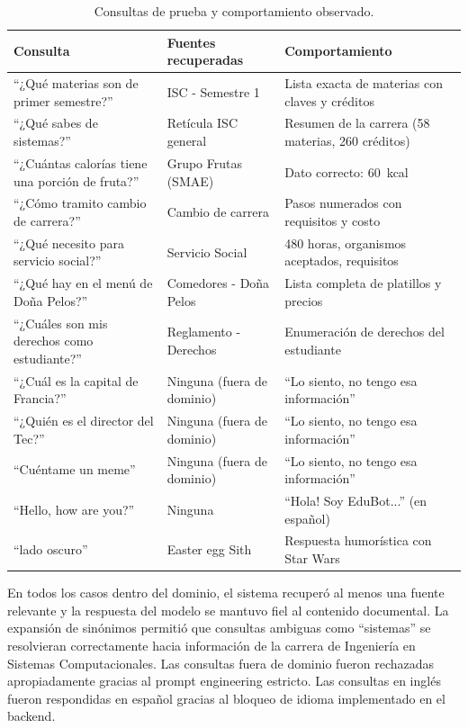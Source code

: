 \begin{table}[htbp]
    \centering
    \caption{Consultas de prueba y comportamiento observado.}
    \label{tab:pruebas}
    \begin{tabular}{@{}p{5.5cm}p{4cm}p{4.5cm}@{}}
        \toprule
        \textbf{Consulta} & \textbf{Fuentes recuperadas} & \textbf{Comportamiento} \\
        \midrule
        ``¿Qué materias son de primer semestre?'' & ISC - Semestre 1 & Lista exacta de materias con claves y créditos \\
        ``¿Qué sabes de sistemas?'' & Retícula ISC general & Resumen de la carrera (58 materias, 260 créditos) \\
        ``¿Cuántas calorías tiene una porción de fruta?'' & Grupo Frutas (SMAE) & Dato correcto: 60~kcal \\
        ``¿Cómo tramito cambio de carrera?'' & Cambio de carrera & Pasos numerados con requisitos y costo \\
        ``¿Qué necesito para servicio social?'' & Servicio Social & 480 horas, organismos aceptados, requisitos \\
        ``¿Qué hay en el menú de Doña Pelos?'' & Comedores - Doña Pelos & Lista completa de platillos y precios \\
        ``¿Cuáles son mis derechos como estudiante?'' & Reglamento - Derechos & Enumeración de derechos del estudiante \\
        ``¿Cuál es la capital de Francia?'' & Ninguna (fuera de dominio) & ``Lo siento, no tengo esa información'' \\
        ``¿Quién es el director del Tec?'' & Ninguna (fuera de dominio) & ``Lo siento, no tengo esa información'' \\
        ``Cuéntame un meme'' & Ninguna (fuera de dominio) & ``Lo siento, no tengo esa información'' \\
        ``Hello, how are you?'' & Ninguna & ``Hola! Soy EduBot...'' (en español) \\
        ``lado oscuro'' & Easter egg Sith & Respuesta humorística con Star Wars \\
        \bottomrule
    \end{tabular}
\end{table}

En todos los casos dentro del dominio, el sistema recuperó al menos una fuente relevante y la respuesta del modelo se mantuvo fiel al contenido documental. La expansión de sinónimos permitió que consultas ambiguas como ``sistemas'' se resolvieran correctamente hacia información de la carrera de Ingeniería en Sistemas Computacionales. Las consultas fuera de dominio fueron rechazadas apropiadamente gracias al prompt engineering estricto. Las consultas en inglés fueron respondidas en español gracias al bloqueo de idioma implementado en el backend.

